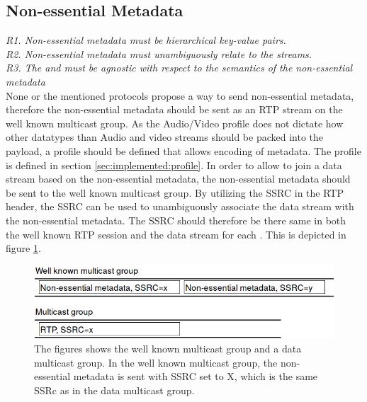 \subsection{Non-essential Metadata} \label{sec:design:nonessential}
\textit{R1. Non-essential metadata must be hierarchical key-value pairs.} \\
\textit{R2. Non-essential metadata must unambiguously relate to the streams.} \\
\textit{R3. The \pub{} and \sub{} must be agnostic with respect to the semantics of the non-essential metadata} \\
None or the mentioned protocols propose a way to send non-essential metadata, therefore the non-essential metadata should be sent as an RTP stream on the well known multicast group. As the Audio/Video profile does not dictate how other datatypes than Audio and video streams should be packed into the payload, a profile should be defined that allows encoding of metadata. The profile is defined in section \ref{sec:implemented:profile}. In order to allow \subs{} to join a data stream based on the non-essential metadata, the non-essential metadata should be sent to the well known multicast group. By utilizing the SSRC in the RTP header, the SSRC can be used to unambiguously associate the data stream with the non-essential metadata. The SSRC should therefore be there same in both the well known RTP session and the data stream for each \pub{}. This is depicted in figure \ref{fig:design:nonessential:fig}.

\begin{figure}[H]
	\centering
	\includegraphics[width=\textwidth]{figures/non-essential-ssrc}
	\caption{The figures shows the well known multicast group and a data multicast group. In the well known multicast group, the non-essential metadata is sent with SSRC set to X, which is the same SSRc as in the data multicast group.} \label{fig:design:nonessential:fig}
\end{figure}


